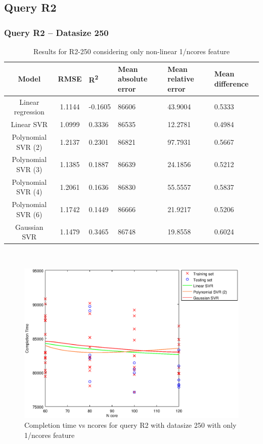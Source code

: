 \documentclass[a4paper,11pt]{article}
\begin{document}
\newpage
\subsection{Query R2}
\subsubsection{Query R2 -- Datasize 250}
\begin{table}[H]
	\centering
	\begin{adjustbox}{center}
		\begin{tabular}{c | c M{1.2cm} M{2.5cm} M{2.5cm} M{1.8cm}}
			Model & RMSE & R\textsuperscript{2} & Mean absolute error & Mean relative error & Mean difference \tabularnewline
			\hline
			Linear regression & 1.1144 & -0.1605 &  86606 & 43.9004 & 0.5333 \\
			Linear SVR & 1.0999 & 0.3336 &  86535 & 12.2781 & 0.4984 \\
			Polynomial SVR (2) & 1.2137 & 0.2301 &  86821 & 97.7931 & 0.5667 \\
			Polynomial SVR (3) & 1.1385 & 0.1887 &  86639 & 24.1856 & 0.5212 \\
			Polynomial SVR (4) & 1.2061 & 0.1636 &  86830 & 55.5557 & 0.5837 \\
			Polynomial SVR (6) & 1.1742 & 0.1449 &  86666 & 21.9217 & 0.5206 \\
			Gaussian SVR & 1.1479 & 0.3465 &  86748 & 19.8558 & 0.6024 \\
		\end{tabular}
	\end{adjustbox}
	\\
	\caption{Results for R2-250 considering only non-linear 1/ncores feature}
	\label{table_R2_prediction_all}
\end{table}

\begin {figure}[hbtp]
\centering
\includegraphics[width=\textwidth]{output/R2_250_ONLY_1_OVER_NCORES/plot_R2_250_bestmodels.eps}
\caption {Completion time vs ncores for query R2 with datasize 250 with only 1/ncores feature}
\end {figure}
\end{document}
